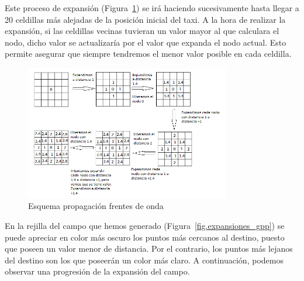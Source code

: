 Este proceso de expansión (Figura~\ref{fig.algoritmo_expansion_gpp}) se irá haciendo sucesivamente hasta llegar a 20 celdillas más alejadas de la posición inicial del taxi. A la hora de realizar la expansión, si las celdillas vecinas tuvieran un valor mayor al que calculara el nodo, dicho valor se actualizaría por el valor que expanda el nodo actual. Esto permite asegurar que siempre tendremos el menor valor posible en cada celdilla.\\

\begin{figure}[H]
  \begin{center}
    \includegraphics[width=0.8\textwidth]{figures/GPP/algoritmo_expansion.png}
		\caption{Esquema propagación frentes de onda}
		\label{fig.algoritmo_expansion_gpp}
		\end{center}
\end{figure}


En la rejilla del campo que hemos generado (Figura~\ref{fig.expansiones_gpp}) se puede apreciar en color más oscuro los puntos más cercanos al destino, puesto que poseen un valor menor de distancia. Por el contrario, los puntos más lejanos del destino son los que poseerán un color más claro. A continuación, podemos observar una progresión de la expansión del campo.\\

